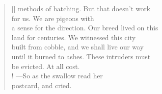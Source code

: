 \documentclass{book}
\begin{document}
\begin{verse}[\versewidth]
    methods of hatching. But that doesn't work\\
    for us. We are pigeons with\\
    a sense for the direction. Our breed lived on this \\
    land for centuries. We witnessed this city\\
    built from cobble, and we shall live our way\\
    until it burned to ashes. These intruders must\\
    be evicted. At all cost. \\! 
    ---So as the swallow read her \\
    postcard, and cried.
\end{verse}

\newpage
\poemtitle{\textcolor[RGB]{175,25,25}{The rainy redemption}}
\hspace*{\fill} \\
\settowidth{\versewidth}{the dim envelope of his cell. Forming a looming}
\end{document}
